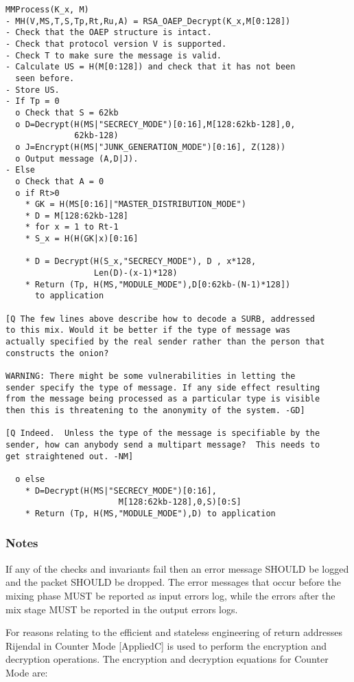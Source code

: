 \documentclass{article}
\begin{document}
\begin{verbatim}
MMProcess(K_x, M)
- MH(V,MS,T,S,Tp,Rt,Ru,A) = RSA_OAEP_Decrypt(K_x,M[0:128])
- Check that the OAEP structure is intact.
- Check that protocol version V is supported.
- Check T to make sure the message is valid.
- Calculate US = H(M[0:128]) and check that it has not been
  seen before.
- Store US.
- If Tp = 0
  o Check that S = 62kb
  o D=Decrypt(H(MS|"SECRECY_MODE")[0:16],M[128:62kb-128],0,
              62kb-128)
  o J=Encrypt(H(MS|"JUNK_GENERATION_MODE")[0:16], Z(128))
  o Output message (A,D|J).
- Else
  o Check that A = 0
  o if Rt>0 
    * GK = H(MS[0:16]|"MASTER_DISTRIBUTION_MODE")
    * D = M[128:62kb-128]
    * for x = 1 to Rt-1
    * S_x = H(H(GK|x)[0:16]

    * D = Decrypt(H(S_x,"SECRECY_MODE"), D , x*128, 
                  Len(D)-(x-1)*128)
    * Return (Tp, H(MS,"MODULE_MODE"),D[0:62kb-(N-1)*128]) 
      to application

[Q The few lines above describe how to decode a SURB, addressed
to this mix. Would it be better if the type of message was
actually specified by the real sender rather than the person that
constructs the onion?

WARNING: There might be some vulnerabilities in letting the
sender specify the type of message. If any side effect resulting
from the message being processed as a particular type is visible
then this is threatening to the anonymity of the system. -GD]

[Q Indeed.  Unless the type of the message is specifiable by the
sender, how can anybody send a multipart message?  This needs to
get straightened out. -NM] 

  o else
    * D=Decrypt(H(MS|"SECRECY_MODE")[0:16],
                       M[128:62kb-128],0,S)[0:S]
    * Return (Tp, H(MS,"MODULE_MODE"),D) to application
\end{verbatim}

\subsubsection{Notes}

If any of the checks and invariants fail then an error message SHOULD
be logged and the packet SHOULD be dropped. The error messages that
occur before the mixing phase MUST be reported as input errors log,
while the errors after the mix stage MUST be reported in the output
errors logs.

For reasons relating to the efficient and stateless engineering of return 
addresses Rijendal in Counter Mode [AppliedC] is used to perform the 
encryption and decryption operations. The encryption and decryption
equations for Counter Mode are:
\end{document}
